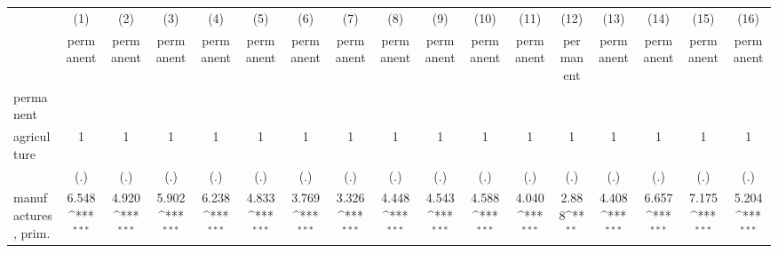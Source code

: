 {
\def\sym#1{\ifmmode^{#1}\else\(^{#1}\)\fi}
\begin{tabular}{l*{16}{c}}
\hline\hline
                    &\multicolumn{1}{c}{(1)}&\multicolumn{1}{c}{(2)}&\multicolumn{1}{c}{(3)}&\multicolumn{1}{c}{(4)}&\multicolumn{1}{c}{(5)}&\multicolumn{1}{c}{(6)}&\multicolumn{1}{c}{(7)}&\multicolumn{1}{c}{(8)}&\multicolumn{1}{c}{(9)}&\multicolumn{1}{c}{(10)}&\multicolumn{1}{c}{(11)}&\multicolumn{1}{c}{(12)}&\multicolumn{1}{c}{(13)}&\multicolumn{1}{c}{(14)}&\multicolumn{1}{c}{(15)}&\multicolumn{1}{c}{(16)}\\
                    &\multicolumn{1}{c}{permanent}&\multicolumn{1}{c}{permanent}&\multicolumn{1}{c}{permanent}&\multicolumn{1}{c}{permanent}&\multicolumn{1}{c}{permanent}&\multicolumn{1}{c}{permanent}&\multicolumn{1}{c}{permanent}&\multicolumn{1}{c}{permanent}&\multicolumn{1}{c}{permanent}&\multicolumn{1}{c}{permanent}&\multicolumn{1}{c}{permanent}&\multicolumn{1}{c}{permanent}&\multicolumn{1}{c}{permanent}&\multicolumn{1}{c}{permanent}&\multicolumn{1}{c}{permanent}&\multicolumn{1}{c}{permanent}\\
\hline
permanent           &                     &                     &                     &                     &                     &                     &                     &                     &                     &                     &                     &                     &                     &                     &                     &                     \\
agriculture         &           1         &           1         &           1         &           1         &           1         &           1         &           1         &           1         &           1         &           1         &           1         &           1         &           1         &           1         &           1         &           1         \\
                    &         (.)         &         (.)         &         (.)         &         (.)         &         (.)         &         (.)         &         (.)         &         (.)         &         (.)         &         (.)         &         (.)         &         (.)         &         (.)         &         (.)         &         (.)         &         (.)         \\
[1em]
manufactures, prim. &       6.548\sym{***}&       4.920\sym{***}&       5.902\sym{***}&       6.238\sym{***}&       4.833\sym{***}&       3.769\sym{***}&       3.326\sym{***}&       4.448\sym{***}&       4.543\sym{***}&       4.588\sym{***}&       4.040\sym{***}&       2.888\sym{**} &       4.408\sym{***}&       6.657\sym{***}&       7.175\sym{***}&       5.204\sym{***}\\

\end{tabular}}

